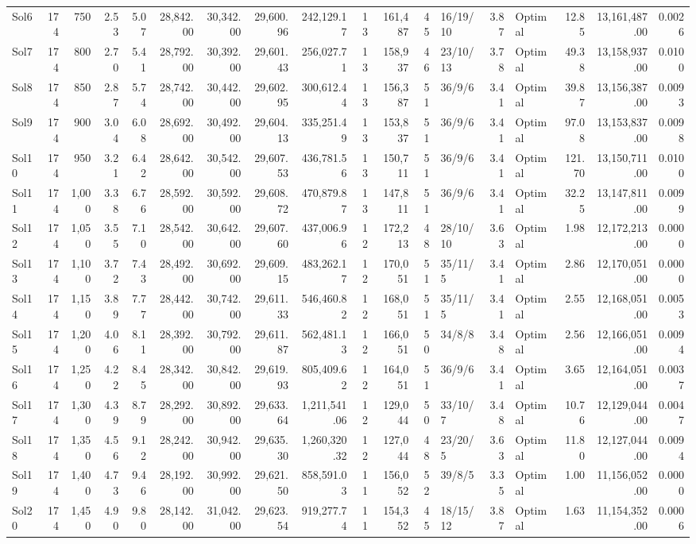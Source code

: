 \documentclass[a4paper]{article}
\begin{document}
{\begin{longtable}{lrrrrrrrrrrrlrlrrr}
Sol6&174&750& 2.53& 5.07&28,842.00&30,342.00&29,600.96&242,129.17&13&161,487&45&16/19/10& 3.87&Optimal&12.85&13,161,487.00&0.0026\\ 
Sol7&174&800& 2.70& 5.41&28,792.00&30,392.00&29,601.43&256,027.71&13&158,937&46&23/10/13& 3.78&Optimal&49.38&13,158,937.00&0.0100\\ 
Sol8&174&850& 2.87& 5.74&28,742.00&30,442.00&29,602.95&300,612.44&13&156,387&51&36/9/6& 3.41&Optimal&39.87&13,156,387.00&0.0093\\ 
Sol9&174&900& 3.04& 6.08&28,692.00&30,492.00&29,604.13&335,251.49&13&153,837&51&36/9/6& 3.41&Optimal&97.08&13,153,837.00&0.0098\\ 
Sol10&174&950& 3.21& 6.42&28,642.00&30,542.00&29,607.53&436,781.56&13&150,711&51&36/9/6& 3.41&Optimal&121.70&13,150,711.00&0.0100\\ 
Sol11&174&1,000& 3.38& 6.76&28,592.00&30,592.00&29,608.72&470,879.87&13&147,811&51&36/9/6& 3.41&Optimal&32.25&13,147,811.00&0.0099\\ 
Sol12&174&1,050& 3.55& 7.10&28,542.00&30,642.00&29,607.60&437,006.96&12&172,213&48&28/10/10& 3.63&Optimal& 1.98&12,172,213.00&0.0000\\ 
Sol13&174&1,100& 3.72& 7.43&28,492.00&30,692.00&29,609.15&483,262.17&12&170,051&51&35/11/5& 3.41&Optimal& 2.86&12,170,051.00&0.0000\\ 
Sol14&174&1,150& 3.89& 7.77&28,442.00&30,742.00&29,611.33&546,460.82&12&168,051&51&35/11/5& 3.41&Optimal& 2.55&12,168,051.00&0.0053\\ 
Sol15&174&1,200& 4.06& 8.11&28,392.00&30,792.00&29,611.87&562,481.13&12&166,051&50&34/8/8& 3.48&Optimal& 2.56&12,166,051.00&0.0094\\ 
Sol16&174&1,250& 4.22& 8.45&28,342.00&30,842.00&29,619.93&805,409.62&12&164,051&51&36/9/6& 3.41&Optimal& 3.65&12,164,051.00&0.0037\\ 
Sol17&174&1,300& 4.39& 8.79&28,292.00&30,892.00&29,633.64&1,211,541.06&12&129,044&50&33/10/7& 3.48&Optimal&10.76&12,129,044.00&0.0047\\ 
Sol18&174&1,350& 4.56& 9.12&28,242.00&30,942.00&29,635.30&1,260,320.32&12&127,044&48&23/20/5& 3.63&Optimal&11.80&12,127,044.00&0.0094\\ 
Sol19&174&1,400& 4.73& 9.46&28,192.00&30,992.00&29,621.50&858,591.03&11&156,052&52&39/8/5& 3.35&Optimal& 1.00&11,156,052.00&0.0000\\ 
Sol20&174&1,450& 4.90& 9.80&28,142.00&31,042.00&29,623.54&919,277.74&11&154,352&45&18/15/12& 3.87&Optimal& 1.63&11,154,352.00&0.0006\\ 

\end{longtable}}
\end{document}
